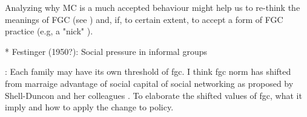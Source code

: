 \documentclass[12pt,]{article}
\newcommand{\comment}[1]{\textbf{[[#1]]}}
\newcommand{\cfcmt}[1]{\comment{CFS: #1}}
\begin{document}

Analyzing why MC is a much accepted behaviour might help us to re-think the meanings of FGC (see \cite{DarbSvob07}) and, if, to certain extent, to accept a form of FGC practice (e.g, a "nick" \cite{Wade11}).



 * Festinger (1950?):  Social pressure in informal groups


\cite{EffeVoge15}:  Each family may have its own threshold of fgc. I think fgc norm has shifted from marraige advantage of social capital of social networking as proposed by Shell-Duncon and her colleagues \cite{ShelWand11}.  To elaborate the shifted values of fgc, what it imply and how to apply the change to policy.

\end{document}
